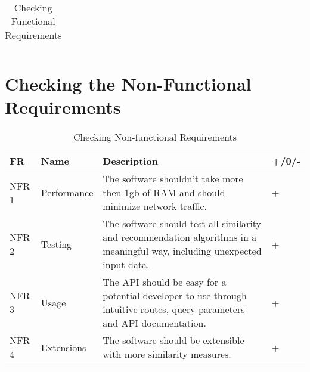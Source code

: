 \begin{longtable}{|p{1.2cm}||p{3.2cm}|p{8cm}|p{1cm}|}
  \caption{Checking Functional Requirements}
  \label{tab:c-fas}
\end{longtable}

\section{Checking the Non-Functional Requirements}

\label{sec:check_non_func_req}

\begin{longtable}{|p{1.2cm}||p{3.2cm}|p{8cm}|p{1cm}|}
    \hline
	  FR & Name & Description & +/0/-\\
    \hline
    NFR 1 & Performance & The software shouldn't take more then 1gb of RAM and should minimize network traffic. & +\\
    \hline
    NFR 2 & Testing & The software should test all similarity and recommendation algorithms in a meaningful way, including unexpected input data. & +\\
    \hline
    NFR 3 & Usage & The API should be easy for a potential developer to use through intuitive routes, query parameters and API documentation. & +\\
    \hline
    NFR 4 & Extensions & The software should be extensible with more similarity measures. & +\\
    \hline
  \caption{Checking Non-functional Requirements}
  \label{tab:c-nfas}
\end{longtable}
